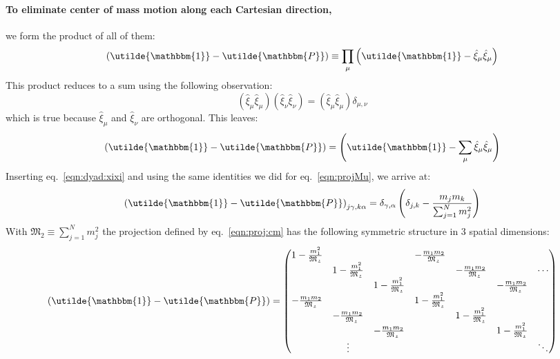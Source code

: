 \documentclass[letter,11pt]{article}
\newcommand{\cvec}[1]{\utilde{#1}}
\newcommand{\laeq}[1]{\label{eqn:#1}}
\newcommand{\refeq}[1]{eq.~\ref{eqn:#1}}
\newcommand{\MM}{\mathfrak{M_2}}
\begin{document}
\paragraph{To eliminate center of mass motion along each Cartesian direction,} we form the product of all of them:
\begin{equation}
  \left( \cvec{\mathbbm{1}} - \cvec{\mathbbm{P}} \right) \equiv \prod_{\mu} \left( \cvec{\mathbbm{1}} - \hat{\xi}_{\mu}\hat{\xi}_{\mu} \right)
\end{equation}
This product reduces to a sum using the following observation:
\[
  \left( \hat{\xi}_{\mu}\hat{\xi}_{\mu} \right )  \left( \hat{\xi}_{\nu}\hat{\xi}_{\nu} \right ) =   \left( \hat{\xi}_{\mu}\hat{\xi}_{\mu} \right ) \delta_{\mu,\nu}
\]
which is true because $\hat{\xi}_{\mu}$ and $\hat{\xi}_{\nu}$ are orthogonal. This leaves:
\begin{equation}
  \left( \cvec{\mathbbm{1}} - \cvec{\mathbbm{P}} \right) = \left( \cvec{\mathbbm{1}} - \sum_{\mu} \hat{\xi}_{\mu}\hat{\xi}_{\mu} \right)
\end{equation}
Inserting \refeq{dyad:xixi} and using the same identities we did for \refeq{projMu}, we arrive at:
\begin{equation}\laeq{proj:cm}
  {\left( \cvec{\mathbbm{1}} - \cvec{\mathbbm{P}} \right)}_{j\gamma,k\alpha} = \delta_{\gamma,\alpha} \left(\delta_{j,k} - \frac{m_j m_k}{\sum_{j=1}^N m_j^2} \right)
\end{equation}
With $\MM \equiv \sum_{j=1}^N m_j^2$ the projection defined by \refeq{proj:cm} has the following symmetric structure in 3 spatial dimensions:
\begin{equation}
  \left( \cvec{\mathbbm{1}} - \cvec{\mathbbm{P}} \right) =
  \begin{pmatrix}
    1 - \frac{m_1^2}{\MM} & & & - \frac{m_1 m_2}{\MM} & & &\\
    & 1 - \frac{m_1^2}{\MM} & & & - \frac{m_1 m_2}{\MM} & &\cdots \\
    & & 1 - \frac{m_1^2}{\MM} & & & - \frac{m_1 m_2}{\MM} & \\
    - \frac{m_1 m_2}{\MM} & & & 1 - \frac{m_1^2}{\MM} & & &\\
    & - \frac{m_1 m_2}{\MM} & & & 1 - \frac{m_1^2}{\MM} & &\\
    & & - \frac{m_1 m_2}{\MM} & & & 1 - \frac{m_1^2}{\MM} &\\
    & \vdots & & & & & \ddots
  \end{pmatrix}
\end{equation}
\end{document}
